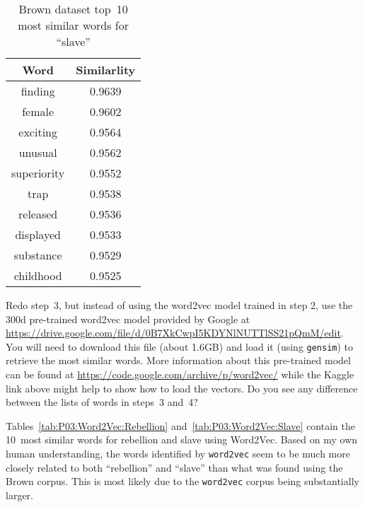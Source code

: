\begin{table}[h]
  \centering
  \caption{Brown dataset top~10 most similar words for ``slave''}\label{tab:P03:Brown:Slave}
  \begin{tabular}{|c|c|}
    \hline
    \textbf{Word} & \textbf{Similarlity} \\\hline\hline
    finding       & 0.9639 \\\hline
    female        & 0.9602 \\\hline
    exciting      & 0.9564 \\\hline
    unusual       & 0.9562 \\\hline
    superiority   & 0.9552 \\\hline
    trap          & 0.9538 \\\hline
    released      & 0.9536 \\\hline
    displayed     & 0.9533 \\\hline
    substance     & 0.9529 \\\hline
    childhood     & 0.9525 \\\hline
  \end{tabular}
\end{table}

\begin{subproblem}
  Redo step~3, but instead of using the word2vec model trained in step 2, use the 300d pre-trained word2vec model provided by Google at \url{https://drive.google.com/file/d/0B7XkCwpI5KDYNlNUTTlSS21pQmM/edit}. You will need to download this file (about 1.6GB) and load it (using \texttt{gensim}) to retrieve the most similar words. More information about this pre-trained model can be found at \url{https://code.google.com/archive/p/word2vec/} while the Kaggle link above might help to show how to load the vectors. Do you see any difference between the lists of words in steps~3 and~4?
\end{subproblem}

Tables~\ref{tab:P03:Word2Vec:Rebellion} and~\ref{tab:P03:Word2Vec:Slave} contain the 10~most similar words for rebellion and slave using Word2Vec.  Based on my own human understanding, the words identified by \texttt{word2vec} seem to be much more closely related to both ``rebellion'' and ``slave'' than what was found using the Brown corpus.  This is most likely due to the \texttt{word2vec} corpus being substantially larger.

